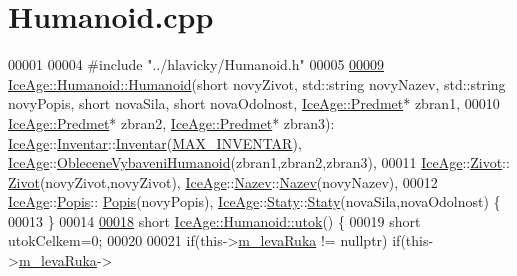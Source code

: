 \hypertarget{Humanoid_8cpp_source}{}\section{Humanoid.\+cpp}
\label{Humanoid_8cpp_source}

\begin{DoxyCode}
00001 
00004 \textcolor{preprocessor}{#include "../hlavicky/Humanoid.h"}
00005 
\hypertarget{Humanoid_8cpp_source.tex_l00009}{}\hyperlink{classIceAge_1_1Humanoid_aa569118f9afa5ec9ddac4a9ec813d4ba}{00009} \hyperlink{classIceAge_1_1Humanoid_aa569118f9afa5ec9ddac4a9ec813d4ba}{IceAge::Humanoid::Humanoid}(\textcolor{keywordtype}{short} novyZivot, std::string novyNazev, std::string 
      novyPopis, \textcolor{keywordtype}{short} novaSila, \textcolor{keywordtype}{short} novaOdolnost, \hyperlink{classIceAge_1_1Predmet}{IceAge::Predmet}* zbran1,
00010         \hyperlink{classIceAge_1_1Predmet}{IceAge::Predmet}* zbran2, \hyperlink{classIceAge_1_1Predmet}{IceAge::Predmet}* zbran3):
      \hyperlink{namespaceIceAge}{IceAge}::\hyperlink{classIceAge_1_1Inventar}{Inventar}::\hyperlink{classIceAge_1_1Inventar}{Inventar}(\hyperlink{Inventar_8h_a7f7b2fb89fb505a51ef23f49620a3d0f}{MAX\_INVENTAR}), 
      \hyperlink{namespaceIceAge}{IceAge}::\hyperlink{classIceAge_1_1ObleceneVybaveniHumanoid}{ObleceneVybaveniHumanoid}(zbran1,zbran2,zbran3),
00011                                                      \hyperlink{namespaceIceAge}{IceAge}::\hyperlink{classIceAge_1_1Zivot}{Zivot}::
      \hyperlink{classIceAge_1_1Zivot}{Zivot}(novyZivot,novyZivot), \hyperlink{namespaceIceAge}{IceAge}::\hyperlink{classIceAge_1_1Nazev}{Nazev}::\hyperlink{classIceAge_1_1Nazev}{Nazev}(novyNazev),
00012                                                      \hyperlink{namespaceIceAge}{IceAge}::\hyperlink{classIceAge_1_1Popis}{Popis}::
      \hyperlink{classIceAge_1_1Popis}{Popis}(novyPopis), \hyperlink{namespaceIceAge}{IceAge}::\hyperlink{classIceAge_1_1Staty}{Staty}::\hyperlink{classIceAge_1_1Staty}{Staty}(novaSila,novaOdolnost) \{
00013 \}
00014 
\hypertarget{Humanoid_8cpp_source.tex_l00018}{}\hyperlink{classIceAge_1_1Humanoid_aa8f63dfba3ef74a0666e9fb9c9e96df4}{00018} \textcolor{keywordtype}{short} \hyperlink{classIceAge_1_1Humanoid_aa8f63dfba3ef74a0666e9fb9c9e96df4}{IceAge::Humanoid::utok}() \{
00019     \textcolor{keywordtype}{short} utokCelkem=0;
00020 
00021     \textcolor{keywordflow}{if}(this->\hyperlink{classIceAge_1_1ObleceneVybaveniHumanoid_aab35aa50c2707e31f7f86509d75aed32}{m\_levaRuka} != \textcolor{keyword}{nullptr})    \textcolor{keywordflow}{if}(this->\hyperlink{classIceAge_1_1ObleceneVybaveniHumanoid_aab35aa50c2707e31f7f86509d75aed32}{m\_levaRuka}->

\end{DoxyCode}
